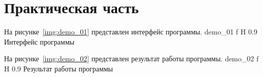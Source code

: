 \chapter{Практическая часть}

На рисунке~\ref{img:demo_01} представлен интерфейс программы.
	{demo_01}
	{f}
	{H}
	{0.9\textwidth}
	{Интерфейс программы}

На рисунке~\ref{img:demo_02} представлен результат работы программы.
	{demo_02}
	{f}
	{H}
	{0.9\textwidth}
	{Результат работы программы}
